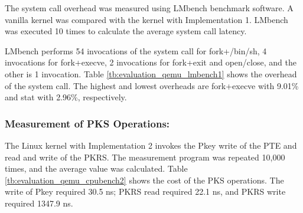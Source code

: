 The system call overhead was measured using LMbench benchmark software. 
%
A vanilla kernel was compared with the kernel with Implementation 1.
LMbench was executed 10 times to calculate the average system call latency.

LMbench performs 54 invocations of the system call for fork+/bin/sh, 4 invocations
for fork+execve, 2 invocations for fork+exit and open/close, and the other is 1
invocation.
Table \ref{tb:evaluation_qemu_lmbench1} shows the overhead of the system call. The
highest and lowest overheads are fork+execve with 9.01\% and stat with 2.96\%,
respectively.


\subsubsection{Measurement of PKS Operations:}

The Linux kernel with Implementation 2 invokes the Pkey write of the PTE and
read and write of the PKRS. The measurement program was repeated 10,000 times, and
the average value was calculated.
Table \ref{tb:evaluation_qemu_cpubench2} shows the cost of the PKS operations.
The write of Pkey required 30.5 ns; PKRS read required 22.1 ns, and PKRS
write required 1347.9 ns.

